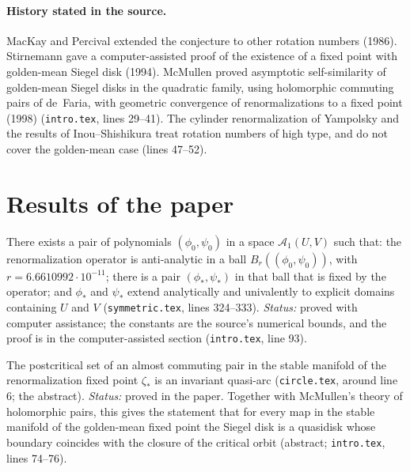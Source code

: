 \paragraph{History stated in the source.}
MacKay and Percival extended the conjecture to other rotation numbers (1986).  Stirnemann gave a computer-assisted proof of the
existence of a fixed point with golden-mean Siegel disk (1994).  McMullen proved asymptotic self-similarity of golden-mean Siegel
disks in the quadratic family, using holomorphic commuting pairs of de~Faria, with geometric convergence of renormalizations to a
fixed point (1998) (\texttt{intro.tex}, lines 29--41).  The cylinder renormalization of Yampolsky and the results of Inou--Shishikura
treat rotation numbers of high type, and do not cover the golden-mean case (lines 47--52).

\section{Results of the paper}
\label{sec:siegel-results}

\begin{theorem}
\label{thm:gy-main1}
There exists a pair of polynomials $(\phi_0,\psi_0)$ in a space $\mathcal A_1(U,V)$ such that: the renormalization operator is
anti-analytic in a ball $B_r((\phi_0,\psi_0))$, with $r=6.6610992\cdot10^{-11}$; there is a pair $(\phi_*,\psi_*)$ in that ball that is
fixed by the operator; and $\phi_*$ and $\psi_*$ extend analytically and univalently to explicit domains containing $U$ and $V$
(\texttt{symmetric.tex}, lines 324--333).  \emph{Status:} proved with computer assistance; the constants are the source's numerical
bounds, and the proof is in the computer-assisted section (\texttt{intro.tex}, line 93).
\end{theorem}

\begin{theorem}
\label{thm:gy-main4}
The postcritical set of an almost commuting pair in the stable manifold of the renormalization fixed point $\zeta_*$ is an
invariant quasi-arc (\texttt{circle.tex}, around line 6; the abstract).  \emph{Status:} proved in the paper.  Together with
McMullen's theory of holomorphic pairs, this gives the statement that for every map in the stable manifold of the golden-mean fixed
point the Siegel disk is a quasidisk whose boundary coincides with the closure of the critical orbit (abstract; \texttt{intro.tex}, lines 74--76).
\end{theorem}

